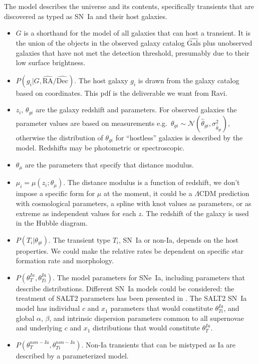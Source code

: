 \documentclass[preprint]{aastex}
\begin{document}
The model describes the universe and its contents, specifically transients
that are discovered as typed as SN~Ia and their host galaxies.
\begin{itemize}
\item $G$ is a shorthand for the model of all galaxies that can host a transient.  It is
the union of the objects in the observed galaxy catalog $\hat{\text{Gals}}$
plus unobserved galaxies that have not
met the detection threshold, presumably due to their low surface brightness.
\item $P(g_i | G, \hat{\text{RA}}/\hat{\text{Dec}})$. The host galaxy $g_i$
is drawn from the galaxy catalog based on coordinates.
This pdf is
the deliverable we want from Ravi.
\item $z_i$, $\theta_{gi}$ are the galaxy redshift and parameters.
For observed galaxies the parameter values are based on measurements e.g.\ $\theta_{gi} \sim \mathcal{N}(\hat{\theta}_{gi},\sigma^2_{\hat{\theta}_{gi}})$, otherwise the distribution
of $\theta_{gi}$ for ``hostless'' galaxies is described by the model.
Redshifts may be photometric or spectroscopic.
\item $\theta_\mu$ are the parameters that specify that distance modulus.
\item $\mu_i=\mu(z_i; \theta_\mu)$.  The distance modulus is a function of redshift,
we don't impose a specific form for  $\mu$ at the moment,  it could
be a $\Lambda$CDM prediction with cosmological parameters, a spline with knot values
as parameters, or as extreme as independent values for each $z$.
The redshift of the galaxy is used in the Hubble diagram.
\item $P(T_i | \theta_{gi})$.  The transient type $T_i$, SN~Ia or non-Ia, depends
on the host properties.  We could make the relative rates be dependent
on specific star formation rate and morphology.
\item $P(\theta_T^{Ia}, \theta_{Ti}^{Ia})$.  The model parameters for SNe~Ia, including
parameters that describe distributions.
Different SN~Ia models could be considered: the treatment of SALT2 parameters
has been presented in \citet{2011MNRAS.418.2308M}.
The SALT2 SN~Ia
model has individual $c$ and $x_1$ parameters that would constitute $\theta_{Ti}^{Ia}$,
and global $\alpha$, $\beta$, and intrinsic dispersion  parameters  common to all supernovae
 and  underlying  $c$ and $x_1$ distributions that would constitute $\theta_T^{Ia}$.
\item $P(\theta_T^{non-Ia}, \theta_{Ti}^{non-Ia})$.  Non-Ia transients
that can be mistyped as Ia are described by a parameterized model.

\end{itemize}
\end{document}
